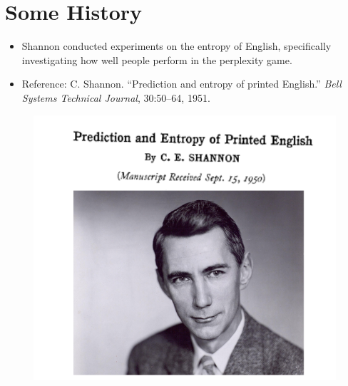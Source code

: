 \documentclass{book}
\begin{document}
\section{Some History}
     \begin{itemize}
        \item Shannon conducted experiments on the entropy of English, specifically investigating how well people perform in the perplexity game.
        \item Reference: C. Shannon. ``Prediction and entropy of printed English.'' \textit{Bell Systems Technical Journal}, 30:50–64, 1951. \cite{shannon1951prediction}
    \end{itemize}
    
    
 \begin{figure}[h]
        	\includegraphics[scale = 0.4]{pics/shannon.png}
        \end{figure}  
    
\end{document}
